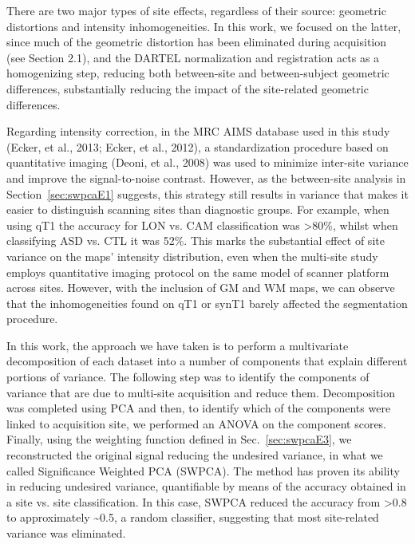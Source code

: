 	There are two major types of site effects, regardless of their source:
	geometric distortions and intensity inhomogeneities. In this work, we
	focused on the latter, since much of the geometric distortion has been
	eliminated during acquisition (see Section 2.1), and the DARTEL
	normalization and registration acts as a homogenizing step, reducing
	both between-site and between-subject geometric differences,
	substantially reducing the impact of the site-related geometric
	differences. 


	Regarding intensity correction, in the MRC AIMS database used in this
	study (Ecker, et al., 2013; Ecker, et al., 2012), a standardization
	procedure based on quantitative imaging (Deoni, et al., 2008) was used
	to minimize inter-site variance and improve the signal-to-noise
	contrast. However, as the between-site analysis in Section~\ref{sec:swpcaE1}
	suggests, this strategy still results in variance that makes it easier
	to distinguish scanning sites than diagnostic groups. For example, when
	using \ac{qT1} the accuracy for LON vs. CAM classification was
	{\textgreater}80\%, whilst when classifying ASD vs. CTL it was 52\%.
	This marks the substantial effect of site variance on the maps’
	intensity distribution, even when the multi-site study employs
	quantitative imaging protocol on the same model of scanner platform
	across sites. However, with the inclusion of \ac{GM} and \ac{WM} maps, we can
	observe that the inhomogeneities found on \ac{qT1} or \ac{synT1} barely affected
	the segmentation procedure. 


	In this work, the approach we have taken is to perform a multivariate
	decomposition of each dataset into a number of components that explain
	different portions of variance. The following step was to identify the
	components of variance that are due to multi-site acquisition and
	reduce them. Decomposition was completed using PCA and then, to
	identify which of the components were linked to acquisition site, we
	performed an ANOVA on the component scores. Finally, using the
	weighting function defined in Sec.~\ref{sec:swpcaE3}, we reconstructed the original
	signal reducing the undesired variance, in what we called Significance
	Weighted PCA (SWPCA). The method has proven its ability in reducing
	undesired variance, quantifiable by means of the accuracy obtained in a
	site vs. site classification. In this case, SWPCA reduced the accuracy
	from {\textgreater}0.8 to approximately \~{}0.5, a random classifier,
	suggesting that most site-related variance was eliminated. 


